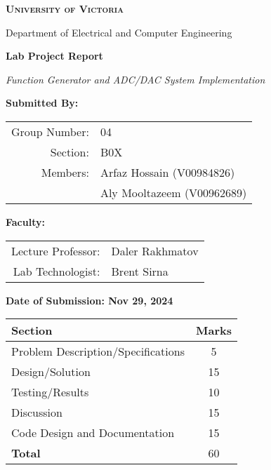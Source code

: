 \begin{titlepage}
\begin{center}

{\Large\bfseries\scshape University of Victoria \par}
{\large Department of Electrical and Computer Engineering \par}
\vspace{1.5cm}

{\Huge\bfseries Lab Project Report \par}
\vspace{0.4cm}
{\LARGE\textit{Function Generator and ADC/DAC System Implementation} \par}
\vspace{1.2cm}

{\large\bfseries Submitted By: \par}
\vspace{0.4cm}
\begin{tabular}{rl}
Group Number: & 04 \\
Section: & B0X \\
Members: & Arfaz Hossain (V00984826) \\
         & Aly Mooltazeem (V00962689) \\
\end{tabular}
\vspace{1cm}

{\large\bfseries Faculty: \par}
\vspace{0.4cm}
\begin{tabular}{rl}
Lecture Professor: & Daler Rakhmatov \\
Lab Technologist: & Brent Sirna \\
\end{tabular}
\vspace{1cm}

{\large\bfseries Date of Submission: Nov 29, 2024 \par}
\vspace{1.5cm}

\begin{tabular}{|p{8cm}|c|}
\hline
\textbf{Section} & \textbf{Marks} \\
\hline
Problem Description/Specifications & 5 \\
Design/Solution & 15 \\
Testing/Results & 10 \\
Discussion & 15 \\
Code Design and Documentation & 15 \\
\hline
\textbf{Total} & 60 \\
\hline
\end{tabular}

\end{center}
\end{titlepage}
